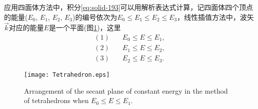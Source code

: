 应用四面体方法中，积分\eqref{eq:solid-193}可以用解析表达式计算，记四面体四个顶点的能量($E_0$, $E_1$, $E_2$, $E_3$)的编号依次为$E_0\leqslant E_1\leqslant E_2\leqslant E_3$，线性插值方法中，波矢$\vec k$对应的能量$E$是一个平面(图\ref{Tetrahedron})，这里
\begin{equation}
  \begin{split}
    (1)\quad&E_0\leqslant E\leqslant E_1,\\
    (2)\quad&E_1\leqslant E\leqslant E_2,\\
    (3)\quad&E_2\leqslant E\leqslant E_3.
  \end{split}
  \label{eq:solid-197}
\end{equation}

\begin{figure}[!h]
\centering
 \texttt{[image: Tetrahedron.eps]}
\caption{\small Arrangement of the secant plane of constant energy in the method of tetrahedrons when $E_0\leqslant E\leqslant E_1$.}
\label{Tetrahedron}
\end{figure}

